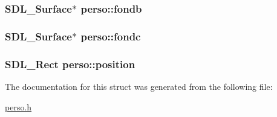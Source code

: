 \subsubsection[{\texorpdfstring{fondb}{fondb}}]{\setlength{\rightskip}{0pt plus 5cm}S\+D\+L\+\_\+\+Surface$\ast$ perso\+::fondb}\hypertarget{structperso_a436b5abedfc6ba00785a3cf4ff6bc32c}{}\label{structperso_a436b5abedfc6ba00785a3cf4ff6bc32c}
\subsubsection[{\texorpdfstring{fondc}{fondc}}]{\setlength{\rightskip}{0pt plus 5cm}S\+D\+L\+\_\+\+Surface$\ast$ perso\+::fondc}\hypertarget{structperso_ac022be57eda44dffb7cd61238105d829}{}\label{structperso_ac022be57eda44dffb7cd61238105d829}
\subsubsection[{\texorpdfstring{position}{position}}]{\setlength{\rightskip}{0pt plus 5cm}S\+D\+L\+\_\+\+Rect perso\+::position}\hypertarget{structperso_a74aed265eb926987cf218b19d163c746}{}\label{structperso_a74aed265eb926987cf218b19d163c746}


The documentation for this struct was generated from the following file\+:\begin{DoxyCompactItemize}
\item 
\hyperlink{perso_8h}{perso.\+h}\end{DoxyCompactItemize}
